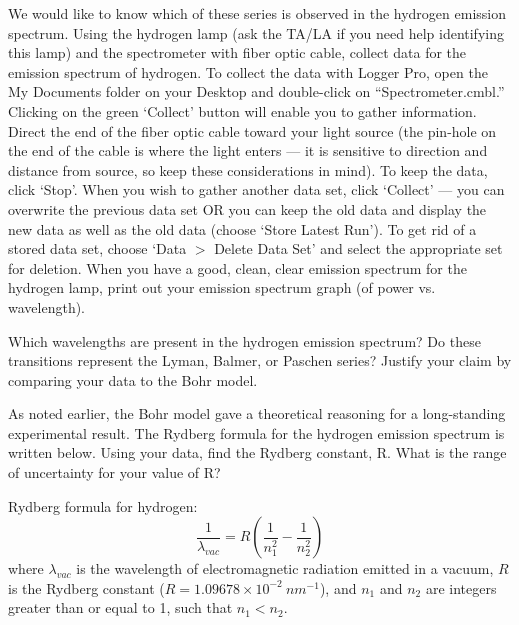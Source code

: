 \par
We would like to know which of these series is observed in the hydrogen emission spectrum.
Using the hydrogen lamp (ask the TA/LA if you need help identifying this lamp) and the spectrometer with fiber optic cable, collect data for the emission spectrum of hydrogen. 
To collect the data with Logger Pro, open the My Documents folder on your Desktop and double-click on “Spectrometer.cmbl.” 
Clicking on the green `Collect' button will enable you to gather information.
Direct the end of the fiber optic cable toward your light source (the pin-hole on the end of the cable is where the light enters — it is sensitive to direction and distance from source, so keep these considerations in mind). 
To keep the data, click `Stop'. 
When you wish to gather another data set, click `Collect' — you can overwrite the previous data set OR you can keep the old data and display the new data as well as the old data (choose `Store Latest Run'). 
To get rid of a stored data set, choose `Data $>$ Delete Data Set' and select the appropriate set for deletion. 
When you have a good, clean, clear emission spectrum for the hydrogen lamp, print out your emission spectrum graph (of power vs. wavelength).
\par 
Which wavelengths are present in the hydrogen emission spectrum? 
Do these transitions represent the Lyman, Balmer, or Paschen series? 
Justify your claim by comparing your data to the Bohr model. 
\par 
As noted earlier, the Bohr model gave a theoretical reasoning for a long-standing experimental result. 
The Rydberg formula for the hydrogen emission spectrum is written below. 
Using your data, find the Rydberg constant, R. 
What is the range of uncertainty for your value of R?
\par
\noindent
Rydberg formula for hydrogen:
\[ \frac{1}{\lambda_{vac}} = R \left( \frac{1}{n_{1}^{2}} - \frac{1}{n_{2}^{2}} \right) \]
where $ \lambda_{vac} $ is the wavelength of electromagnetic radiation emitted in a vacuum, $R$ is the Rydberg constant ($R = 1.09678\times 10^{-2} \: nm^{-1}$), and $n_{1}$ and $n_{2}$ are integers greater than or equal to 1, such that $n_{1} < n_{2}$.

